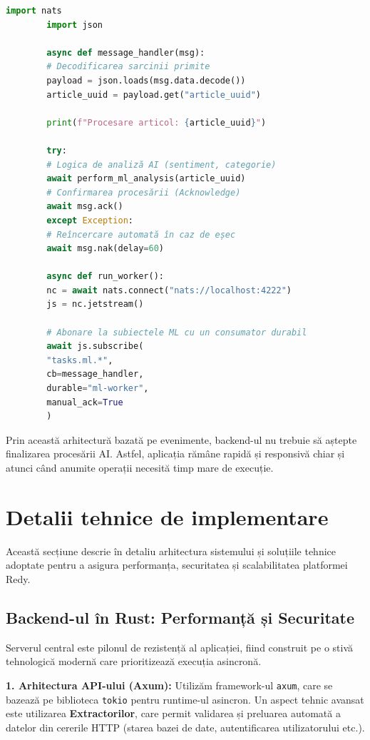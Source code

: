 \documentclass[12pt,a4paper]{article}
\begin{document}
	\begin{lstlisting}[language=Python, caption=Worker ML care procesează sarcinile (Python)]
		import nats
		import json
		
		async def message_handler(msg):
		# Decodificarea sarcinii primite
		payload = json.loads(msg.data.decode())
		article_uuid = payload.get("article_uuid")
		
		print(f"Procesare articol: {article_uuid}")
		
		try:
		# Logica de analiză AI (sentiment, categorie)
		await perform_ml_analysis(article_uuid)
		# Confirmarea procesării (Acknowledge)
		await msg.ack()
		except Exception:
		# Reîncercare automată în caz de eșec
		await msg.nak(delay=60)
		
		async def run_worker():
		nc = await nats.connect("nats://localhost:4222")
		js = nc.jetstream()
		
		# Abonare la subiectele ML cu un consumator durabil
		await js.subscribe(
		"tasks.ml.*",
		cb=message_handler,
		durable="ml-worker",
		manual_ack=True
		)
	\end{lstlisting}
	
	Prin această arhitectură bazată pe evenimente, backend-ul nu trebuie să aștepte finalizarea procesării AI. Astfel, aplicația rămâne rapidă și responsivă chiar și atunci când anumite operații necesită timp mare de execuție.
	
	\newpage
	
	\section{Detalii tehnice de implementare}
	
	Această secțiune descrie în detaliu arhitectura sistemului și soluțiile tehnice adoptate pentru a asigura performanța, securitatea și scalabilitatea platformei Redy.
	
	\subsection{Backend-ul în Rust: Performanță și Securitate}
	
	Serverul central este pilonul de rezistență al aplicației, fiind construit pe o stivă tehnologică modernă care prioritizează execuția asincronă.
	
	\textbf{1. Arhitectura API-ului (Axum):}
	Utilizăm framework-ul \texttt{axum}, care se bazează pe biblioteca \texttt{tokio} pentru runtime-ul asincron. Un aspect tehnic avansat este utilizarea \textbf{Extractorilor}, care permit validarea și preluarea automată a datelor din cererile HTTP (starea bazei de date, autentificarea utilizatorului etc.).
	
\end{document}
